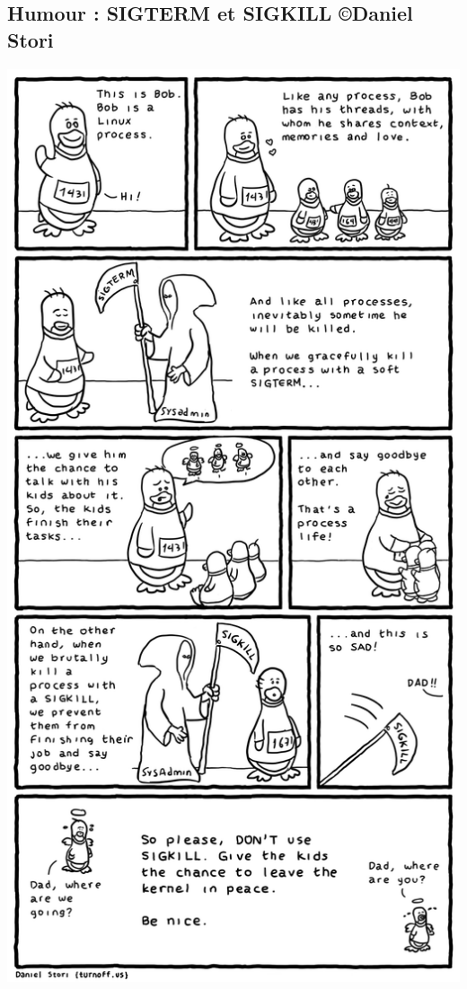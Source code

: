 \documentclass[10pt,french,A4]{article}
\theoremstyle{plain}
\begin{document}
\subsection*{Humour :  SIGTERM et SIGKILL \copyright Daniel Stori}
\begin{center}
    \includegraphics[width=0.75\linewidth]{dont-sigkill}
\end{center}
\end{document}
